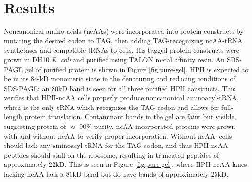 \documentclass[9pt,twocolumn,twoside]{pnas-new}
\begin{document}
\section{Results}
Noncanonical amino acids (ncAAs) were incorporated into protein constructs by mutating the desired codon to TAG, then adding TAG-recognizing ncAA-tRNA synthetases and compatible tRNAs to cells. His-tagged protein constructs were grown in DH10 \textit{E. coli} and purified using TALON metal affinity resin. An SDS-PAGE gel of purified protein is shown in Figure \ref{fig:pure-gel}. HPII is expected to be in its 84-kD monomeric state in the denaturing and reducing conditions of SDS-PAGE; an 80kD band is seen for all three purified HPII constructs. This verifies that HPII-ncAA cells properly produce noncanonical aminoacyl-tRNA, which is the only tRNA which recognizes the TAG codon and allows for full-length protein translation. Contaminant bands in the gel are faint but visible, suggesting protein of $\approx$ 90\% purity. ncAA-incorporated proteins were grown with and without ncAA to verify proper incorporation. Without ncAA, cells should lack any aminoacyl-tRNA for the TAG codon, and thus HPII-ncAA peptides should stall on the ribosome, resulting in truncated peptides of approximately 22kD. This is seen in Figure \ref{fig:pure-gel}, where HPII-ncAA lanes lacking ncAA lack a 80kD band but do have bands of approximately 25kD.\\
\end{document}
